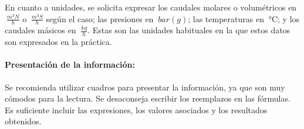 En cuanto a unidades, se solicita expresar los caudales molares o volumétricos en $\SI{}{\frac{m^3N}{h}}$ o $\SI{}{\frac{m^3S}{h}}$ según el caso; las presiones en $\SI{}{bar(g)}$; las temperaturas en $\SI{}{\celsius}$; y los caudales másicos en $\SI{}{\frac{kg}{h}}$. Estas son las unidades habituales en la que estos datos son expresados en la práctica.

\paragraph{Presentación de la información:} Se recomienda utilizar cuadros para presentar la información, ya que son muy cómodos para la lectura. Se desaconseja escribir los reemplazos en las fórmulas. Es suficiente incluir las expresiones, los valores asociados y los resultados obtenidos.